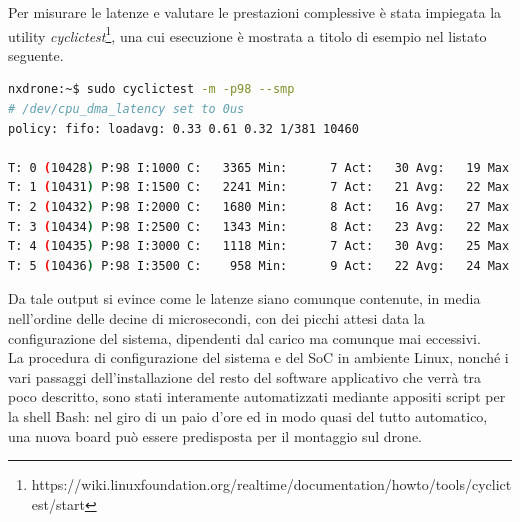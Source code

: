 Per misurare le latenze e valutare le prestazioni complessive è stata impiegata la utility \emph{cyclictest}\footnote{https://wiki.linuxfoundation.org/realtime/documentation/howto/tools/cyclictest/start}, una cui esecuzione è mostrata a titolo di esempio nel listato seguente.
\vspace{1cm}
\begin{lstlisting}[language=bash, caption=Esempio di benchmark del SoC montato sul drone eseguito con la utility \emph{cyclictest}.]
nxdrone:~$ sudo cyclictest -m -p98 --smp
# /dev/cpu_dma_latency set to 0us
policy: fifo: loadavg: 0.33 0.61 0.32 1/381 10460          

T: 0 (10428) P:98 I:1000 C:   3365 Min:      7 Act:   30 Avg:   19 Max:     147
T: 1 (10431) P:98 I:1500 C:   2241 Min:      7 Act:   21 Avg:   22 Max:     294
T: 2 (10432) P:98 I:2000 C:   1680 Min:      8 Act:   16 Avg:   27 Max:     352
T: 3 (10434) P:98 I:2500 C:   1343 Min:      8 Act:   23 Avg:   22 Max:     155
T: 4 (10435) P:98 I:3000 C:   1118 Min:      7 Act:   30 Avg:   25 Max:     147
T: 5 (10436) P:98 I:3500 C:    958 Min:      9 Act:   22 Avg:   24 Max:     319
\end{lstlisting}

Da tale output si evince come le latenze siano comunque contenute, in media nell'ordine delle decine di microsecondi, con dei picchi attesi data la configurazione del sistema, dipendenti dal carico ma comunque mai eccessivi.\\
La procedura di configurazione del sistema e del SoC in ambiente Linux, nonché i vari passaggi dell'installazione del resto del software applicativo che verrà tra poco descritto, sono stati interamente automatizzati mediante appositi script per la shell Bash: nel giro di un paio d'ore ed in modo quasi del tutto automatico, una nuova board può essere predisposta per il montaggio sul drone.
\clearpage

